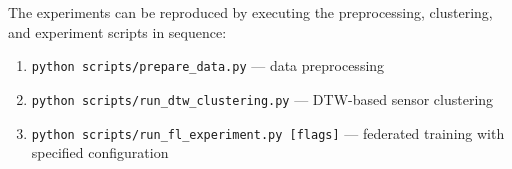 The experiments can be reproduced by executing the preprocessing, clustering, and experiment scripts in sequence:

\begin{enumerate}
    \item \texttt{python scripts/prepare\_data.py} --- data preprocessing
    \item \texttt{python scripts/run\_dtw\_clustering.py} --- DTW-based sensor clustering
    \item \texttt{python scripts/run\_fl\_experiment.py [flags]} --- federated training with specified configuration
\end{enumerate}
